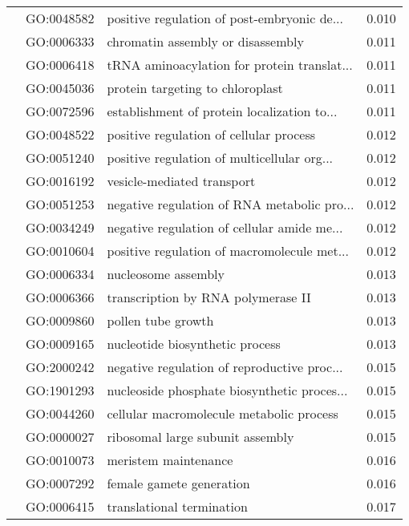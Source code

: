 \begin{longtable}{lllr}
   & GO:0048582 &  positive regulation of post-embryonic de... &         0.010 \\
   & GO:0006333 &            chromatin assembly or disassembly &         0.011 \\
   & GO:0006418 &  tRNA aminoacylation for protein translat... &         0.011 \\
   & GO:0045036 &             protein targeting to chloroplast &         0.011 \\
   & GO:0072596 &  establishment of protein localization to... &         0.011 \\
   & GO:0048522 &      positive regulation of cellular process &         0.012 \\
   & GO:0051240 &  positive regulation of multicellular org... &         0.012 \\
   & GO:0016192 &                   vesicle-mediated transport &         0.012 \\
   & GO:0051253 &  negative regulation of RNA metabolic pro... &         0.012 \\
   & GO:0034249 &  negative regulation of cellular amide me... &         0.012 \\
   & GO:0010604 &  positive regulation of macromolecule met... &         0.012 \\
   & GO:0006334 &                          nucleosome assembly &         0.013 \\
   & GO:0006366 &           transcription by RNA polymerase II &         0.013 \\
   & GO:0009860 &                           pollen tube growth &         0.013 \\
   & GO:0009165 &              nucleotide biosynthetic process &         0.013 \\
   & GO:2000242 &  negative regulation of reproductive proc... &         0.015 \\
   & GO:1901293 &  nucleoside phosphate biosynthetic proces... &         0.015 \\
   & GO:0044260 &     cellular macromolecule metabolic process &         0.015 \\
   & GO:0000027 &             ribosomal large subunit assembly &         0.015 \\
   & GO:0010073 &                         meristem maintenance &         0.016 \\
   & GO:0007292 &                     female gamete generation &         0.016 \\
   & GO:0006415 &                    translational termination &         0.017 \\

\end{longtable}
